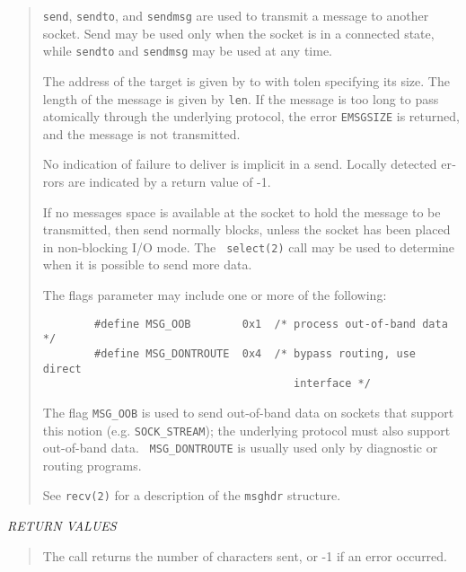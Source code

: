 \begin{appendix}
\begin{english}
\begin{quote}
	{\tt send}, {\tt sendto}, and {\tt sendmsg} are used to transmit a
	message to another socket. Send may be used only when the socket
	is in a connected state, while {\tt sendto} and {\tt sendmsg} may
	be used at any time.

	The address of the target is given by to with tolen specifying its
	size. The length of the message is given by {\tt len}. If the
	message is too long to pass atomically through the underlying
	protocol, the error {\tt EMSGSIZE} is returned, and the message is
	not transmitted.

	No indication of failure to deliver is implicit in a send. Locally
	detected errors are indicated by a return value of -1.

	If no messages space is available at the socket to hold the 
	message to be transmitted, then send normally blocks, unless the
	socket has been placed in non-blocking I/O mode. The {\tt
	select(2)} call may be used to determine when it is possible to send
	more data.

	The flags parameter may include one or more of the following:
	\begin{verbatim}
		#define MSG_OOB        0x1  /* process out-of-band data */
		#define MSG_DONTROUTE  0x4  /* bypass routing, use direct
		                               interface */
	\end{verbatim}

	The flag {\tt MSG\_OOB} is used to send out-of-band data on sockets
	that support this notion (e.g. {\tt SOCK\_STREAM}); the
	underlying protocol must also support out-of-band data. {\tt
	MSG\_DONTROUTE} is usually used only by diagnostic or routing
	programs.

	See {\tt recv(2)} for a description of the {\tt msghdr} structure.
\end{quote}

{\sl RETURN VALUES}
\begin{quote}
	The  call  returns the number of characters sent, or -1 if an error
	occurred.
\end{quote}


\end{english}
\end{appendix}
